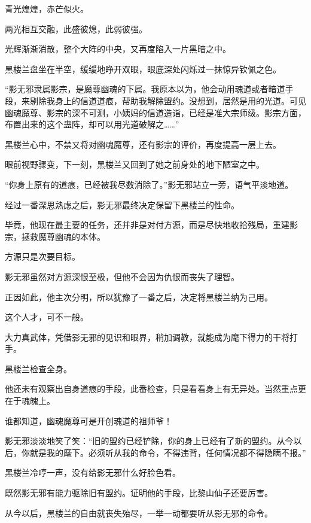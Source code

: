 
\begin{this_body}

青光煌煌，赤芒似火。

两光相互交融，此盛彼熄，此弱彼强。

光辉渐渐消散，整个大阵的中央，又再度陷入一片黑暗之中。

黑楼兰盘坐在半空，缓缓地睁开双眼，眼底深处闪烁过一抹惊异钦佩之色。

“影无邪隶属影宗，是魔尊幽魂的下属。我原本以为，他会动用魂道或者暗道手段，来剔除我身上的信道道痕，帮助我解除盟约。没想到，居然是用的光道。可见幽魂魔尊、影宗的深不可测，小姨妈的信道造诣，已经是准大宗师级。影宗方面，布置出来的这个蛊阵，却可以用光道破解之……”

黑楼兰心中，不禁又将对幽魂魔尊，还有影宗的评价，再度提高一层上去。

眼前视野骤变，下一刻，黑楼兰又回到了她之前身处的地下陋室之中。

“你身上原有的道痕，已经被我尽数消除了。”影无邪站立一旁，语气平淡地道。

经过一番深思熟虑之后，影无邪最终决定保留下黑楼兰的性命。

毕竟，他现在最主要的任务，还并非是对付方源，而是尽快地收拾残局，重建影宗，拯救魔尊幽魂的本体。

方源只是次要目标。

影无邪虽然对方源深恨至极，但他不会因为仇恨而丧失了理智。

正因如此，他主次分明，所以犹豫了一番之后，决定将黑楼兰纳为己用。

这个人才，可不一般。

大力真武体，凭借影无邪的见识和眼界，稍加调教，就能成为麾下得力的干将打手。

黑楼兰检查全身。

他还未有观察出自身道痕的手段，此番检查，只是看看身上有无异处。当然重点更在于魂魄上。

谁都知道，幽魂魔尊可是开创魂道的祖师爷！

影无邪淡淡地笑了笑：“旧的盟约已经铲除，你的身上已经有了新的盟约。从今以后，你就是我的麾下。必须听从我的命令，不得违背，任何情况都不得隐瞒不报。”

黑楼兰冷哼一声，没有给影无邪什么好脸色看。

既然影无邪有能力驱除旧有盟约。证明他的手段，比黎山仙子还要厉害。

从今以后，黑楼兰的自由就丧失殆尽，一举一动都要听从影无邪的命令。


\end{this_body}

